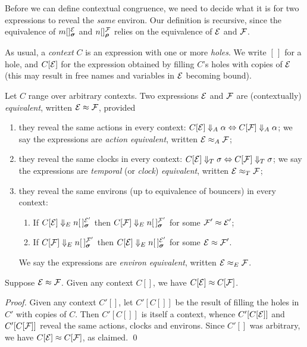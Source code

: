 \documentclass[orivec,envcountsame]{llncs}
\newcommand{\Reveals}[1]{\mathrel{\Downarrow_{#1}}}
\newcommand{\RevealsA}{\Reveals{A}}
\newcommand{\RevealsC}{\Reveals{T}}
\newcommand{\RevealsE}{\Reveals{E}}
\newcommand{\Eq}{\approx}
\newcommand{\EqA}{\mathrel{\Eq_{A}}}
\newcommand{\EqC}{\mathrel{\Eq_{T}}}
\newcommand{\EqE}{\mathrel{\Eq_{E}}}
\begin{document}
Before we can define contextual congruence, we need to decide what it is for 
two expressions to reveal the \emph{same} environ. Our definition is
recursive, since the equivalence of $\locv{m}{}{\expr}{\vec{\sigma}}$ and
$\locv{n}{}{\exprb}{\vec{\rho}}$ relies on the equivalence of $\text{$\mathcal{E}$}$ and
$\text{$\mathcal{F}$}$.

As usual, a \emph{context} $C$ is an expression with one or more
\emph{holes}. We write $[\,]$ for a hole, and $C[\text{$\mathcal{E}$}]$ for the expression
obtained by filling $C$'s holes with copies of $\text{$\mathcal{E}$}$ (this may result
in free names and variables in $\text{$\mathcal{E}$}$ becoming bound).

\begin{definition}
Let $C$ range over arbitrary contexts. Two expressions $\text{$\mathcal{E}$}$ and $\text{$\mathcal{F}$}$
are (contextually) \emph{equivalent}, written $\expr \Eq \exprb$, provided
\begin{enumerate}
\item
     they reveal the same actions in every context: $C[\expr] \RevealsA
     \alpha \Leftrightarrow C[\exprb] \RevealsA \alpha$; we say the
     expressions are \emph{action equivalent}, written $\expr \EqA \exprb$; 
\item
     they reveal the same clocks in every context: $C[\expr] \RevealsC \sigma 
     \Leftrightarrow C[\exprb] \RevealsC \sigma$; we say the expressions are
     \emph{temporal} (or \emph{clock}) \emph{equivalent}, written $\expr \EqC
     \exprb$; 
\item
     they reveal the same environs (up to equivalence of bouncers) in every 
     context:
     \begin{enumerate}
     \item
        If $C[\expr] \RevealsE \locv{n}{\,}{\expr'}{\vec{\sigma}}$
        then 
        $C[\exprb] \RevealsE \locv{n}{\,}{\exprb'}{\vec{\sigma}}$
        for some $\exprb' \Eq \expr'$;
     \item
        If $C[\exprb] \RevealsE \locv{n}{\,}{\exprb'}{\vec{\sigma}}$
        then
        $C[\expr] \RevealsE \locv{n}{\,}{\expr'}{\vec{\sigma}}$
        for some $\expr \Eq \exprb'$.
     \end{enumerate}
     We say the expressions are \emph{environ equivalent}, written $\expr \EqE 
     \exprb$.
\end{enumerate}
\end{definition}


\begin{proposition}
\label{prop:context-substitution} 
Suppose $\expr \Eq \exprb$. Given any context $C[]$, we have $C[\expr]
\Eq C[\exprb]$.
\end{proposition}
\begin{proof}
Given any context $C'[]$, let $C'[C[]]$ be the result of filling the
holes in $C'$ with copies of $C$. Then $C'[C[]]$ is itself a context,
whence $C'[C[\text{$\mathcal{E}$}]]$ and $C'[C[\text{$\mathcal{F}$}]]$ reveal the same actions,
clocks and environs. Since $C'[]$ was arbitrary, we have $C[\expr] \Eq
C[\exprb]$, as claimed.
\qed \end{proof}
\end{document}
